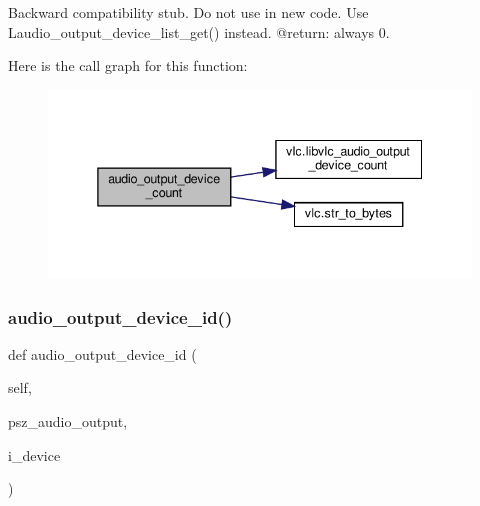 \begin{DoxyVerb}Backward compatibility stub. Do not use in new code.
\deprecated Use L{audio_output_device_list_get}() instead.
@return: always 0.
\end{DoxyVerb}
 Here is the call graph for this function\+:
\nopagebreak
\begin{figure}[H]
\begin{center}
\leavevmode
\includegraphics[width=338pt]{classvlc_1_1_instance_a57716b6319f79d3eaec358210e598d6d_cgraph}
\end{center}
\end{figure}
\mbox{\label{classvlc_1_1_instance_a42c03a29126ded661baf367276c59f5e}} 
\subsubsection{\texorpdfstring{audio\+\_\+output\+\_\+device\+\_\+id()}{audio\_output\_device\_id()}}
{\footnotesize\ttfamily def audio\+\_\+output\+\_\+device\+\_\+id (\begin{DoxyParamCaption}\item[{}]{self,  }\item[{}]{psz\+\_\+audio\+\_\+output,  }\item[{}]{i\+\_\+device }\end{DoxyParamCaption})}

